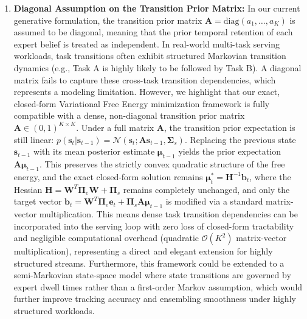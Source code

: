 \documentclass{article}
\theoremstyle{plain}
\theoremstyle{definition}
\theoremstyle{remark}
\begin{document}
\begin{enumerate}
    \item \textbf{Diagonal Assumption on the Transition Prior Matrix:} In our current generative formulation, the transition prior matrix $\mathbf{A} = \text{diag}(a_1, \dots, a_K)$ is assumed to be diagonal, meaning that the prior temporal retention of each expert belief is treated as independent. In real-world multi-task serving workloads, task transitions often exhibit structured Markovian transition dynamics (e.g., Task A is highly likely to be followed by Task B). A diagonal matrix fails to capture these cross-task transition dependencies, which represents a modeling limitation. However, we highlight that our exact, closed-form Variational Free Energy minimization framework is fully compatible with a dense, non-diagonal transition prior matrix $\mathbf{A} \in (0,1)^{K \times K}$. Under a full matrix $\mathbf{A}$, the transition prior expectation is still linear: $p(\mathbf{s}_t | \mathbf{s}_{t-1}) = \mathcal{N}(\mathbf{s}_t; \mathbf{A}\mathbf{s}_{t-1}, \mathbf{\Sigma}_s)$. Replacing the previous state $\mathbf{s}_{t-1}$ with its mean posterior estimate $\mathbf{\mu}_{t-1}$ yields the prior expectation $\mathbf{A}\mathbf{\mu}_{t-1}$. This preserves the strictly convex quadratic structure of the free energy, and the exact closed-form solution remains $\mathbf{\mu}_t^* = \mathbf{H}^{-1}\mathbf{b}_t$, where the Hessian $\mathbf{H} = \mathbf{W}^T \mathbf{\Pi}_e \mathbf{W} + \mathbf{\Pi}_s$ remains completely unchanged, and only the target vector $\mathbf{b}_t = \mathbf{W}^T \mathbf{\Pi}_e \mathbf{e}_t + \mathbf{\Pi}_s \mathbf{A}\mathbf{\mu}_{t-1}$ is modified via a standard matrix-vector multiplication. This means dense task transition dependencies can be incorporated into the serving loop with zero loss of closed-form tractability and negligible computational overhead (quadratic $\mathcal{O}(K^2)$ matrix-vector multiplication), representing a direct and elegant extension for highly structured streams. Furthermore, this framework could be extended to a semi-Markovian state-space model where state transitions are governed by expert dwell times rather than a first-order Markov assumption, which would further improve tracking accuracy and ensembling smoothness under highly structured workloads.


\end{enumerate}
\end{document}
